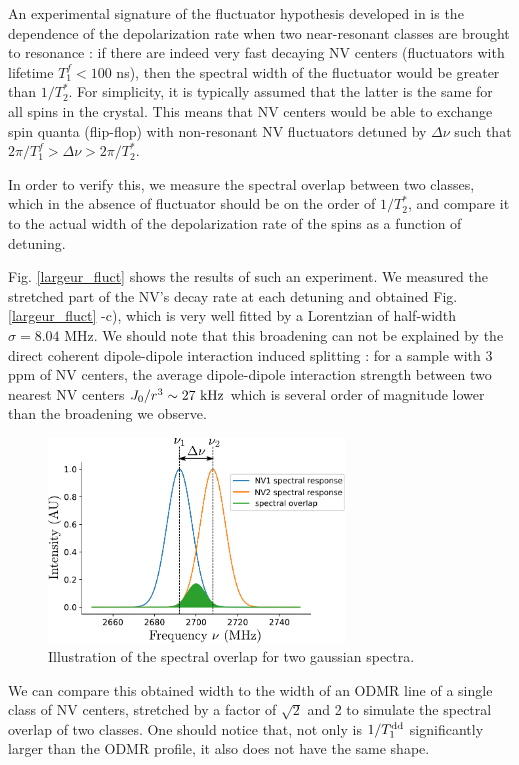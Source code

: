\documentclass[preprintnumbers,amsmath,amssymb,onecolumn,12pt]{revtex4-2}\usepackage{graphicx}%
\begin{document}
An experimental signature of the fluctuator hypothesis developed in \cite{choi_depolarization_2017} is the dependence of the depolarization rate when two near-resonant classes are brought to resonance : if there are indeed very fast decaying NV centers (fluctuators with lifetime $T_1^f < 100$ ns), then the spectral width of the fluctuator would be greater than $1/T_2^*$.  For simplicity, it is typically assumed that the latter is the same for all spins in the crystal. This means that NV centers would be able to exchange spin quanta (flip-flop) with non-resonant NV fluctuators detuned by $\Delta \nu$ such that $2\pi/T_1^f > \Delta \nu > 2\pi/T_2^*$.

In order to verify this, we measure the spectral overlap between two classes, which in the absence of fluctuator should be on the order of $1/T_2^*$, and compare it to the actual width of the depolarization rate of the spins
as a function of detuning.

Fig. \ref{largeur_fluct} shows the results of such an experiment. We measured the stretched part of the NV's decay rate at each detuning and obtained Fig. \ref{largeur_fluct} -c), which is very well fitted by a Lorentzian of half-width $\sigma=8.04$ MHz. 
We should note that this broadening can not be explained by the direct coherent dipole-dipole interaction induced splitting : for a sample with 3 ppm of NV centers, the average dipole-dipole interaction strength between two nearest NV centers $J_0/r^3 \sim 27\ \rm kHz$ which is several order of magnitude lower than the broadening we observe. 

\begin{figure}[h]
\includegraphics[width=0.7\textwidth]{Figures_SI/overlap}
\caption{Illustration of the spectral overlap for two gaussian spectra.}
\label{overlap}
\end{figure}

We can compare this obtained width to the width of an ODMR line of a single class of NV centers, stretched by a factor of $\sqrt{2}$ and 2 to simulate the spectral overlap of two classes. One should notice that, not only is $1/T_1^{\rm dd}$ significantly larger than the ODMR profile, it also does not have the same shape. 
\end{document}
